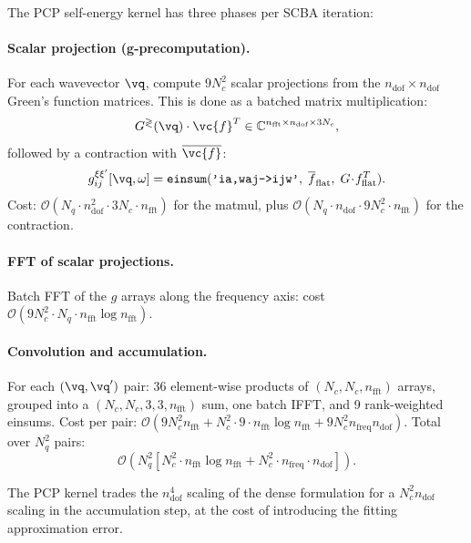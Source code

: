 The PCP self-energy kernel has three phases per SCBA iteration:

\paragraph{Scalar projection (g-precomputation).}
For each wavevector $\vq$, compute $9N_c^2$ scalar projections from the
$n_\mathrm{dof} \times n_\mathrm{dof}$ Green's function matrices.
This is done as a batched matrix multiplication:
\begin{equation}
  G^{\gtrless}(\vq) \cdot \vc{f}^T
  \in \mathbb{C}^{n_\mathrm{fft} \times n_\mathrm{dof} \times 3N_c},
\end{equation}
followed by a contraction with $\overline{\vc{f}}$:
\begin{equation}
  g^{\xi\xi'}_{ij}[\vq, \omega]
  = \texttt{einsum}(\texttt{'ia,waj->ijw'},\;
    \overline{f}_\mathrm{flat},\; G\!\cdot\!f_\mathrm{flat}^T).
\end{equation}
Cost: $\mathcal{O}(N_q \cdot n_\mathrm{dof}^2 \cdot 3N_c \cdot
n_\mathrm{fft})$ for the matmul, plus
$\mathcal{O}(N_q \cdot n_\mathrm{dof} \cdot 9N_c^2 \cdot n_\mathrm{fft})$
for the contraction.

\paragraph{FFT of scalar projections.}
Batch FFT of the $g$ arrays along the frequency axis: cost
$\mathcal{O}(9N_c^2 \cdot N_q \cdot n_\mathrm{fft} \log n_\mathrm{fft})$.

\paragraph{Convolution and accumulation.}
For each $(\vq, \vq')$ pair: 36 element-wise products of
$(N_c, N_c, n_\mathrm{fft})$ arrays, grouped into a
$(N_c, N_c, 3, 3, n_\mathrm{fft})$ sum, one batch IFFT, and 9
rank-weighted einsums.  Cost per pair:
$\mathcal{O}(9N_c^2 n_\mathrm{fft} + N_c^2 \cdot 9 \cdot
n_\mathrm{fft} \log n_\mathrm{fft} + 9 N_c^2 n_\mathrm{freq}
n_\mathrm{dof})$.  Total over $N_q^2$ pairs:
\begin{equation}
  \mathcal{O}\!\left(
    N_q^2 \left[
      N_c^2 \cdot n_\mathrm{fft} \log n_\mathrm{fft}
      + N_c^2 \cdot n_\mathrm{freq} \cdot n_\mathrm{dof}
    \right]
  \right).
\end{equation}

The PCP kernel trades the $n_\mathrm{dof}^4$ scaling of the dense
formulation for a $N_c^2 n_\mathrm{dof}$ scaling in the accumulation
step, at the cost of introducing the fitting approximation error.


